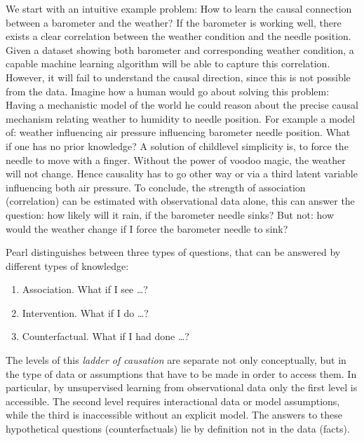 		We start with an intuitive example problem:
		How to learn the causal connection between a barometer and the weather? If the barometer is working well, there exists a clear correlation between the weather condition and the needle position. Given a dataset showing both barometer and corresponding weather condition, a capable machine learning algorithm will be able to capture this correlation. However, it will fail to understand the causal direction, since this is not possible from the data.
		Imagine how a human would go about solving this problem:
		Having a mechanistic model of the world he could reason about the precise causal mechanism relating weather to humidity to needle position. For example a model of: weather influencing air pressure influencing barometer needle position.
		What if one has no prior knowledge? A solution of childlevel simplicity is, to force the needle to move with a finger. Without the power of voodoo magic, the weather will not change. Hence causality has to go other way or via a third latent variable influencing both \ie air pressure.
		To conclude, the strength of association (correlation) can be estimated with observational data alone, this can answer the question: how likely will it rain, if the barometer needle sinks? But not: how would the weather change if I force the barometer needle to sink?

		Pearl \cite{pearl18why} distinguishes between three types of questions, that can be answered by different types of knowledge:
		\begin{enumerate}
			\item Association. What if I see \ldots?
			\item Intervention. What if I do \ldots?
			\item Counterfactual. What if I had done \ldots?
		\end{enumerate}
		The levels of this \textit{ladder of causation} \cite{pearl18why} are separate not only conceptually, but in the type of data or assumptions that have to be made in order to access them. In particular, by unsupervised learning from observational data only the first level is accessible. The second level requires interactional data or model assumptions, while the third is inaccessible without an explicit model. The answers to these hypothetical questions (counterfactuals) lie by definition not in the data (facts).


